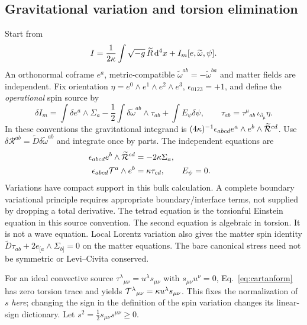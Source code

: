 \subsection{Gravitational variation and torsion elimination}
Start from
\begin{equation}\label{eq:action}
 I=\frac1{2\kappa}\int\sqrt{-g}\,\widetilde R\,\mathrm d^4x+I_m[e,\widetilde\omega,\psi].
\end{equation}
An orthonormal coframe $e^a$, metric-compatible $\widetilde\omega^{ab}=-\widetilde\omega^{ba}$ and matter fields are independent. Fix orientation $\eta=e^0\wedge e^1\wedge e^2\wedge e^3$, $\epsilon_{0123}=+1$, and define the \emph{operational} spin source by
\begin{equation}
 \delta I_m=\int\delta e^a\wedge\Sigma_a-\frac12\int\delta\widetilde\omega^{ab}\wedge\tau_{ab}+\int E_\psi\delta\psi,
 \qquad \tau_{ab}=\tau^\mu{}_{ab}\,\iota_{\partial_\mu}\eta.
\end{equation}
In these conventions the gravitational integrand is $(4\kappa)^{-1}\epsilon_{abcd}e^a\wedge e^b\wedge\widetilde{\mathcal R}^{cd}$. Use $\delta\mathcal R^{ab}=\widetilde D\delta\widetilde\omega^{ab}$ and integrate once by parts. The independent equations are
\begin{align}
 \epsilon_{abcd}e^b\wedge\widetilde{\mathcal R}^{cd}&=-2\kappa\Sigma_a,\\
 \epsilon_{abcd}\mathcal T^a\wedge e^b&=\kappa\tau_{cd}, & E_\psi&=0.\label{eq:cartanform}
\end{align}
Variations have compact support in this bulk calculation. A complete boundary variational principle requires appropriate boundary/interface terms, not supplied by dropping a total derivative. The tetrad equation is the torsionful Einstein equation in this source convention. The second equation is algebraic in torsion. It is not a wave equation. Local Lorentz variation also gives the matter spin identity $\widetilde D\tau_{ab}+2e_{[a}\wedge\Sigma_{b]}=0$ on the matter equations. The bare canonical stress need not be symmetric or Levi--Civita conserved.

For an ideal convective source $\tau^\lambda{}_{\mu\nu}=u^\lambda s_{\mu\nu}$ with $s_{\mu\nu}u^\nu=0$, Eq.~\eqref{eq:cartanform} has zero torsion trace and yields $\mathcal T^\lambda{}_{\mu\nu}=\kappa u^\lambda s_{\mu\nu}$. This fixes the normalization of $s$ \emph{here}; changing the sign in the definition of the spin variation changes its linear-sign dictionary. Let $s^2=\frac12s_{\mu\nu}s^{\mu\nu}\geq0$.

